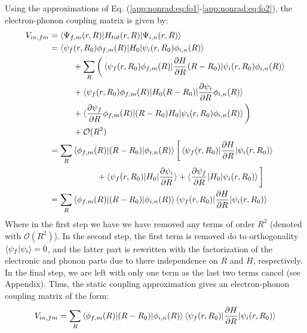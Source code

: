 Using the approximations of Eq. (\ref{app:nonrad:eq:fo1}-\ref{app:nonrad:eq:fo2}), the electron-phonon coupling matrix is given by:
\begin{align}
    V_{in,fm}
    &= \braket{\Psi_{f,m}(r,R)|
    H_{tot}(r,R)
    |\Psi_{i,n}(r,R)} \nonumber \\
    &= \braket{\psi_f(r,R_0)\phi_{f,m}(R)|
    H_0
    |\psi_i(r,R_0)\phi_{i,n}(R)} \nonumber \\
    & \hspace{1cm} + \sum_R \bigg( \braket{\psi_f(r,R_0)\phi_{f,m}(R)|
    \frac{\partial H}{\partial R}(R-R_0)
    |\psi_i(r,R_0)\phi_{i,n}(R)} \nonumber \\
    & \hspace{1cm} + \braket{\psi_f(r,R_0)\phi_{f,m}(R)|
    H_0 (R-R_0)
    |\frac{\partial \psi_i}{\partial R}\phi_{i,n}(R)} \nonumber \\
    & \hspace{1cm} + \braket{\frac{\partial \psi_f}{\partial R}\phi_{f,m}(R)|
    (R-R_0)H_0
    |\psi_i(r,R_0)\phi_{i,n}(R)} \bigg) \nonumber \\
    & \hspace{1cm} + \mathcal{O}(R^2) \nonumber \\
    &= \sum_R \braket{\phi_{f,m}(R)|(R-R_0)
    |\phi_{i,n}(R)}
    \bigg[ \braket{\psi_f(r,R_0)|
    \frac{\partial H}{\partial R}
    |\psi_i(r,R_0)} \nonumber \\
    & \hspace{2cm} + \braket{\psi_f(r,R_0)|
    H_0
    |\frac{\partial \psi_i}{\partial R}}
    + \braket{\frac{\partial \psi_f}{\partial R}|
    H_0
    |\psi_i(r,R_0)} \bigg] \nonumber \\
    &= \sum_R
    \braket{\phi_{f,m}(R)|(R-R_0)|\phi_{i,n}(R)}
    \braket{\psi_f(r,R_0)|\frac{\partial H}{\partial R}|\psi_i(r,R_0)}
\end{align}
Where in the first step we have we have removed any terms of order $R^2$ (denoted with $\mathcal{O}(R^2)$). In the second step, the first term is removed do to orthogonality $\braket{\psi_f|\psi_i}=0$, and the latter part is rewritten with the factorization of the electronic and phonon parts due to there independence on $R$ and $H$, respectively. In the final step, we are left with only one term as the last two terms cancel (see Appendix). Thus, the static coupling approximation gives an electron-phonon coupling matrix of the form:
\begin{align}
    V_{in,fm}= \sum_R
    \braket{\phi_{f,m}(R)|(R-R_0)|\phi_{i,n}(R)}
    \braket{\psi_f(r,R_0)|\frac{\partial H}{\partial R}|\psi_i(r,R_0)}
    \label{app:nonrad:eq:eph1}
\end{align}

